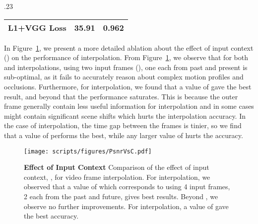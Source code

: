 \documentclass[10pt,twocolumn,letterpaper]{article}
\newcommand{\figref}[1]{Figure~\ref{#1}}
\newcommand{\Ours}{FLAVR}
\newcommand{\twox}{}
\newcommand{\eightx}{}
\begin{document}
\begin{table*}[!t]
\begin{table*}[h]
\begin{subtable}[t]{.23\textwidth}
{\begin{tabular}{l|cc}
L1+VGG Loss      &	35.91   &	0.962 \\
\bottomrule
\end{tabular}}
\captionsetup{width=.9\textwidth}
\label{tab:lossFn}
\end{subtable}
\captionsetup{width=\textwidth}
\vspace{-8pt}
\caption{{\bf Ablation results} for \Ours{} architecture on  different backbones,  fusion methods,  temporal striding, and  loss functions.}
\label{tab:ablations}
\vspace{-8pt}
\end{table*} In \figref{fig:effectOfC}, we present a more detailed ablation about the effect of input context () on the performance of interpolation. From \figref{fig:effectOfC}, we observe that for both \twox{} and \eightx{} interpolations, using two input frames (), one each from past and present is sub-optimal, as it fails to accurately reason about complex motion profiles and occlusions. Furthermore, for \twox{} interpolation, we found that a value of  gave the best result, and beyond that the performance saturates. This is because the outer frame generally contain less useful information for interpolation and in some cases might contain significant scene shifts which hurts the interpolation accuracy. In the case of \eightx{} interpolation, the time gap between the frames is tinier, so we find that a value of  performs the best, while any larger value of  hurts the accuracy. 


\begin{figure}
    \begin{center}
    \texttt{[image: scripts/figures/PsnrVsC.pdf]}
    \end{center}
    \caption{{\bf Effect of Input Context} Comparison of the effect of input context, , for video frame interpolation. For \twox{} interpolation, we observed that a value of  which corresponds to using 4 input frames, 2 each from the past and future, gives best results. Beyond , we observe no further improvements. For \eightx{} interpolation, a value of  gave the best accuracy. }
    \label{fig:effectOfC}
\end{figure}




\end{table*}
\end{document}
